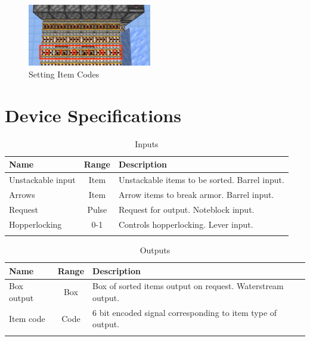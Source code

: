 \documentclass[10pt]{datasheet}
\begin{document}
\begin{figure}[H]
    \centering
    \includegraphics[width=0.48\textwidth]{setting.png}
    \caption{\centering Setting Item Codes}
\end{figure}

\newpage
\section{Device Specifications}

\begin{table}[H]
    \caption{Inputs}
    \begin{tabularx}{\textwidth}{l | c | X}
        \thickhline
        \textbf{Name} & \textbf{Range} & \textbf{Description} \\
        \hline
        Unstackable input & Item & Unstackable items to be sorted. Barrel input. \\
        \hline
        Arrows & Item & Arrow items to break armor. Barrel input. \\
        \hline
        Request & Pulse & Request for output. Noteblock input. \\
        \hline
        Hopperlocking & 0-1 & Controls hopperlocking. Lever input. \\
        \thickhline
\end{tabularx}
\end{table}

\begin{table}[H]
    \caption{Outputs}
    \begin{tabularx}{\textwidth}{l | c | X}
        \thickhline
        \textbf{Name} & \textbf{Range} & \textbf{Description} \\
        \hline
        Box output & Box & Box of sorted items output on request. Waterstream output. \\
        \hline
        Item code & Code & 6 bit encoded signal corresponding to item type of output. \\
        \thickhline
\end{tabularx}
\end{table}
\end{document}
